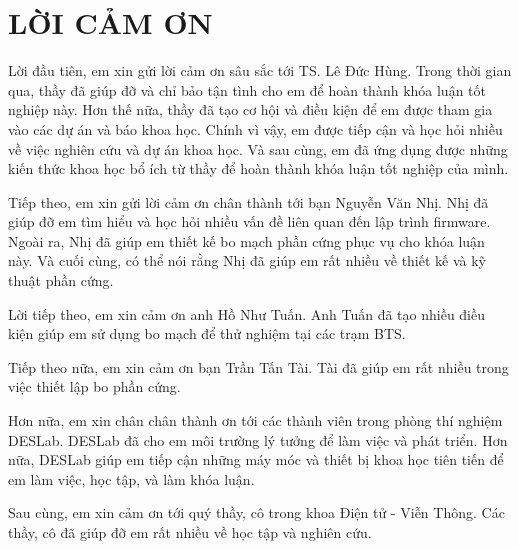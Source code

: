 \chapter*{LỜI CẢM ƠN}
\label{thanks}

Lời đầu tiên, em xin gửi lời cảm ơn sâu sắc tới TS. Lê Đức Hùng. Trong thời gian qua, thầy đã giúp đỡ và chỉ bảo tận tình cho em để hoàn thành khóa luận tốt nghiệp này. Hơn thế nữa, thầy đã tạo cơ hội và điều kiện để em được tham gia vào các dự án và báo khoa học. Chính vì vậy, em được tiếp cận và học hỏi nhiều về việc nghiên cứu và dự án khoa học. Và sau cùng, em đã ứng dụng được những kiến thức khoa học bổ ích từ thầy để hoàn thành khóa luận tốt nghiệp của mình.

Tiếp theo, em xin gửi lời cảm ơn chân thành tới bạn Nguyễn Văn Nhị. Nhị đã giúp đỡ em tìm hiểu và học hỏi nhiều vấn đề liên quan đến lập trình firmware. Ngoài ra, Nhị đã giúp em thiết kế bo mạch phần cứng phục vụ cho khóa luận này. Và cuối cùng, có thể nói rằng Nhị đã giúp em rất nhiều về thiết kế và kỹ thuật phần cứng.

Lời tiếp theo, em xin cảm ơn anh Hồ Như Tuấn. Anh Tuấn đã tạo nhiều điều kiện giúp em sử dụng bo mạch để thử nghiệm tại các trạm BTS.

Tiếp theo nữa, em xin cảm ơn bạn Trần Tấn Tài. Tài đã giúp em rất nhiều trong việc thiết lập bo phần cứng.

Hơn nữa, em xin chân chân thành ơn tới các thành viên trong phòng thí nghiệm DESLab. DESLab đã cho em môi trường lý tưởng để làm việc và phát triển. Hơn nữa, DESLab giúp em tiếp cận những máy móc và thiết bị khoa học tiên tiến để em làm việc, học tập, và làm khóa luận.

Sau cùng, em xin cảm ơn tới quý thầy, cô trong khoa Điện tử - Viễn Thông. Các thầy, cô đã giúp đỡ em rất nhiều về học tập và nghiên cứu.